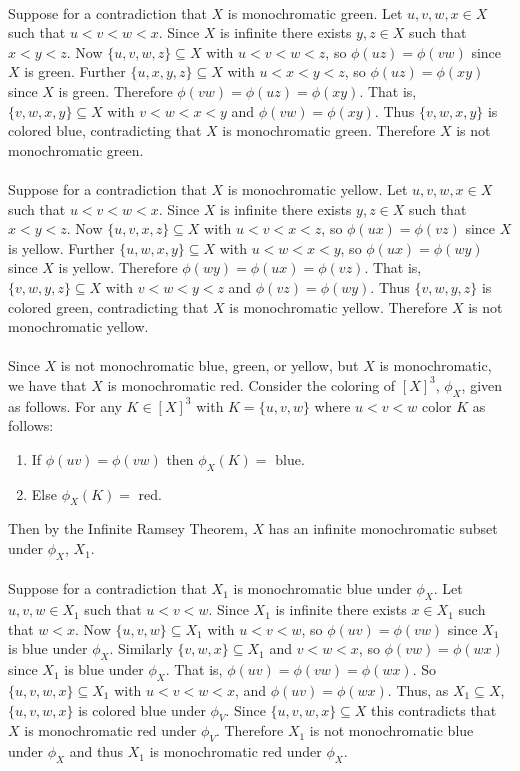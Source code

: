 \documentclass[letterpaper,12pt,oneside,onecolumn]{article}
\begin{document}
\paragraph{}
Suppose for a contradiction that $X$ is monochromatic green. Let $u,v,w,x \in X$ such that $u<v<w<x$. Since $X$ is infinite there exists $y,z \in X$ such that $x<y<z$. Now $\{u,v,w,z\} \subseteq X$ with $u<v<w<z$, so $\phi(uz) = \phi(vw)$ since $X$ is green. Further $\{u,x,y,z\} \subseteq X$ with $u<x<y<z$, so $\phi(uz) = \phi(xy)$ since $X$ is green. Therefore $\phi(vw) = \phi(uz) = \phi(xy)$. That is, $\{v,w,x,y\} \subseteq X$ with $v<w<x<y$ and $\phi(vw) = \phi(xy)$. Thus $\{v,w,x,y\}$ is colored blue, contradicting that $X$ is monochromatic green. Therefore $X$ is not monochromatic green.
\paragraph{}
Suppose for a contradiction that $X$ is monochromatic yellow. Let $u,v,w,x \in X$ such that $u<v<w<x$. Since $X$ is infinite there exists $y,z \in X$ such that $x<y<z$. Now $\{u,v,x,z\} \subseteq X$ with $u<v<x<z$, so $\phi(ux) = \phi(vz)$ since $X$ is yellow. Further $\{u,w,x,y\} \subseteq X$ with $u<w<x<y$, so $\phi(ux) = \phi(wy)$ since $X$ is yellow. Therefore $\phi(wy) = \phi(ux) = \phi(vz)$. That is, $\{v,w,y,z\} \subseteq X$ with $v<w<y<z$ and $\phi(vz) = \phi(wy)$. Thus $\{v,w,y,z\}$ is colored green, contradicting that $X$ is monochromatic yellow. Therefore $X$ is not monochromatic yellow.
\paragraph{}
Since $X$ is not monochromatic blue, green, or yellow, but $X$ is monochromatic, we have that $X$ is monochromatic red. Consider the coloring of $[X]^3$, $\phi_X$, given as follows. For any $K \in [X]^3$ with $K = \{u,v,w\}$ where $u<v<w$ color $K$ as follows:
\begin{enumerate}
\item If $\phi(uv) = \phi(vw)$ then $\phi_X(K)=$ blue.
\item Else $\phi_X(K)=$ red.
\end{enumerate}
Then by the Infinite Ramsey Theorem, $X$ has an infinite monochromatic subset under $\phi_X$, $X_1$.
\paragraph{}
Suppose for a contradiction that $X_1$ is monochromatic blue under $\phi_X$. Let $u,v,w \in X_1$ such that $u<v<w$. Since $X_1$ is infinite there exists $x \in X_1$ such that $w<x$. Now $\{u,v,w\} \subseteq X_1$ with $u<v<w$, so $\phi(uv) = \phi(vw)$ since $X_1$ is blue under $\phi_X$. Similarly $\{v,w,x\} \subseteq X_1$ and $v<w<x$, so $\phi(vw) = \phi(wx)$ since $X_1$ is blue under $\phi_X$. That is, $\phi(uv) = \phi(vw) = \phi(wx)$. So $\{u,v,w,x\} \subseteq X_1$ with $u<v<w<x$, and $\phi(uv) = \phi(wx)$. Thus, as $X_1 \subseteq X$, $\{u,v,w,x\}$ is colored blue under $\phi_V$. Since $\{u,v,w,x\} \subseteq X$ this contradicts that $X$ is monochromatic red under $\phi_V$. Therefore $X_1$ is not monochromatic blue under $\phi_X$ and thus $X_1$ is monochromatic red under $\phi_X$.
\end{document}
